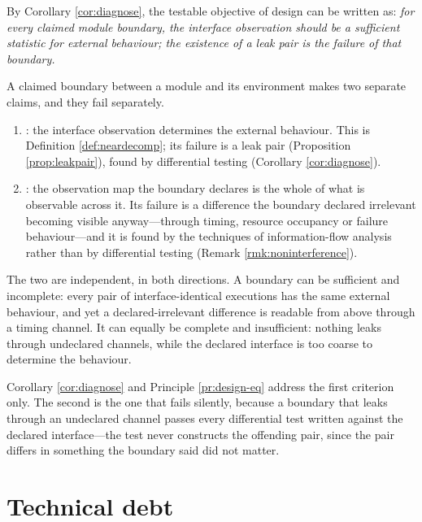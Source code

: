 \begin{principle}\label{pr:design-eq}
By Corollary \ref{cor:diagnose}, the testable objective of design can be written as:
\emph{for every claimed module boundary, the interface observation should be a sufficient
statistic for external behaviour; the existence of a leak pair is the failure of that
boundary.}
\end{principle}

\begin{principle}\label{pr:two-criteria}
A claimed boundary between a module and its environment makes two separate claims, and they fail
separately.
\begin{enumerate}[label=(\alph*)]
\item {}: the interface observation determines the external behaviour. This is
      Definition \ref{def:neardecomp}; its failure is a leak pair (Proposition \ref{prop:leakpair}),
      found by differential testing (Corollary \ref{cor:diagnose}).
\item {}: the observation map the boundary declares is the whole of what is
      observable across it. Its failure is a difference the boundary declared irrelevant becoming
      visible anyway---through timing, resource occupancy or failure behaviour---and it is found by
      the techniques of information-flow analysis rather than by differential testing
      (Remark \ref{rmk:noninterference}).
\end{enumerate}
The two are independent, in both directions. A boundary can be sufficient and incomplete: every pair
of interface-identical executions has the same external behaviour, and yet a declared-irrelevant
difference is readable from above through a timing channel. It can equally be complete and
insufficient: nothing leaks through undeclared channels, while the declared interface is too coarse
to determine the behaviour.

Corollary \ref{cor:diagnose} and Principle \ref{pr:design-eq} address the first criterion only.
The second is the one that fails silently, because a boundary that leaks through an undeclared
channel passes every differential test written against the declared interface---the test never
constructs the offending pair, since the pair differs in something the boundary said did not matter.
\end{principle}

\section{Technical debt}\label{sec:debt}

